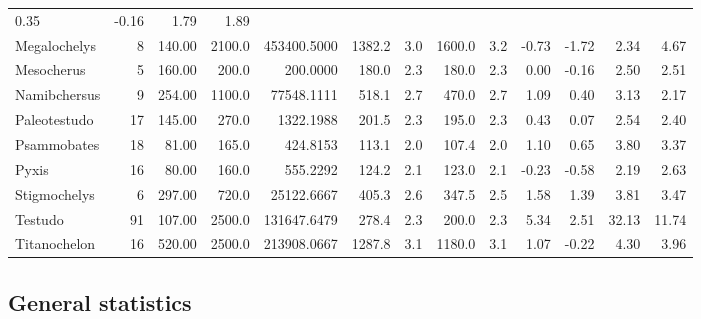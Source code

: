 \documentclass[]{article}
\begin{document}
\begin{longtable}[]{@{}lrrrrrrrrrrrr@{}}
0.35 & -0.16 & 1.79 & 1.89\tabularnewline
Megalochelys & 8 & 140.00 & 2100.0 & 453400.5000 & 1382.2 & 3.0 & 1600.0
& 3.2 & -0.73 & -1.72 & 2.34 & 4.67\tabularnewline
Mesocherus & 5 & 160.00 & 200.0 & 200.0000 & 180.0 & 2.3 & 180.0 & 2.3 &
0.00 & -0.16 & 2.50 & 2.51\tabularnewline
Namibchersus & 9 & 254.00 & 1100.0 & 77548.1111 & 518.1 & 2.7 & 470.0 &
2.7 & 1.09 & 0.40 & 3.13 & 2.17\tabularnewline
Paleotestudo & 17 & 145.00 & 270.0 & 1322.1988 & 201.5 & 2.3 & 195.0 &
2.3 & 0.43 & 0.07 & 2.54 & 2.40\tabularnewline
Psammobates & 18 & 81.00 & 165.0 & 424.8153 & 113.1 & 2.0 & 107.4 & 2.0
& 1.10 & 0.65 & 3.80 & 3.37\tabularnewline
Pyxis & 16 & 80.00 & 160.0 & 555.2292 & 124.2 & 2.1 & 123.0 & 2.1 &
-0.23 & -0.58 & 2.19 & 2.63\tabularnewline
Stigmochelys & 6 & 297.00 & 720.0 & 25122.6667 & 405.3 & 2.6 & 347.5 &
2.5 & 1.58 & 1.39 & 3.81 & 3.47\tabularnewline
Testudo & 91 & 107.00 & 2500.0 & 131647.6479 & 278.4 & 2.3 & 200.0 & 2.3
& 5.34 & 2.51 & 32.13 & 11.74\tabularnewline
Titanochelon & 16 & 520.00 & 2500.0 & 213908.0667 & 1287.8 & 3.1 &
1180.0 & 3.1 & 1.07 & -0.22 & 4.30 & 3.96\tabularnewline
\bottomrule
\end{longtable}

\newpage

\subsection{General statistics}\label{general-statistics}
\end{document}
